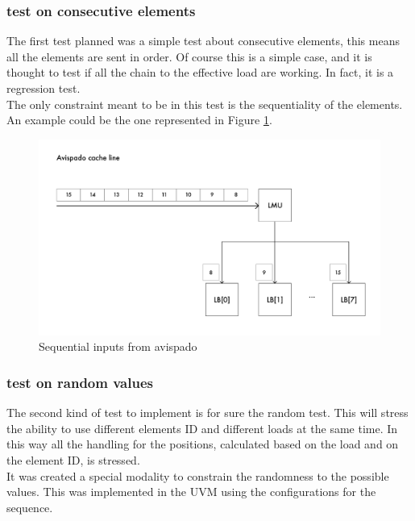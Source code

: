 \subsubsection{test on consecutive elements}
The first test planned was a simple test about consecutive elements, this means all the elements are sent in order. Of course this is a simple case, and it is thought to test if all the chain to the effective load are working. In fact, it is a regression test.\\

The only constraint meant to be in this test is the sequentiality of the elements.\\
An example could be the one represented in Figure \ref{cache-to-lb-seq-ex}.


\begin{figure}[H]
    \centering
    \includegraphics[scale = 0.6]{Chapter_2/img/cache-to-lb-seq-ex.png}
    \caption{Sequential inputs from avispado}
    \label{cache-to-lb-seq-ex}
\end{figure}

\subsubsection{test on random values}
The second kind of test to implement is for sure the random test. This will stress the ability to use different elements ID and different loads at the same time. In this way all the handling for the positions, calculated based on the load and on the element ID, is stressed.\\

It was created a special modality to constrain the randomness to the possible values. This was implemented in the UVM using the configurations for the sequence.\\

